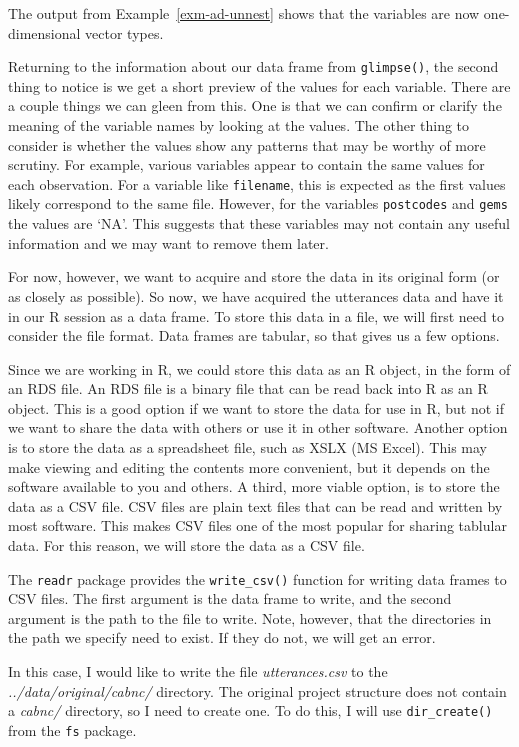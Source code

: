 \documentclass[
  letterpaper,
  DIV=11,
  numbers=noendperiod]{scrreprt}
\theoremstyle{definition}
\theoremstyle{remark}
\begin{document}
The output from Example~\ref{exm-ad-unnest} shows that the variables are
now one-dimensional vector types.

Returning to the information about our data frame from
\texttt{glimpse()}, the second thing to notice is we get a short preview
of the values for each variable. There are a couple things we can gleen
from this. One is that we can confirm or clarify the meaning of the
variable names by looking at the values. The other thing to consider is
whether the values show any patterns that may be worthy of more
scrutiny. For example, various variables appear to contain the same
values for each observation. For a variable like \texttt{filename}, this
is expected as the first values likely correspond to the same file.
However, for the variables \texttt{postcodes} and \texttt{gems} the
values are `NA'. This suggests that these variables may not contain any
useful information and we may want to remove them later.

For now, however, we want to acquire and store the data in its original
form (or as closely as possible). So now, we have acquired the
utterances data and have it in our R session as a data frame. To store
this data in a file, we will first need to consider the file format.
Data frames are tabular, so that gives us a few options.

Since we are working in R, we could store this data as an R object, in
the form of an RDS file. An RDS file is a binary file that can be read
back into R as an R object. This is a good option if we want to store
the data for use in R, but not if we want to share the data with others
or use it in other software. Another option is to store the data as a
spreadsheet file, such as XSLX (MS Excel). This may make viewing and
editing the contents more convenient, but it depends on the software
available to you and others. A third, more viable option, is to store
the data as a CSV file. CSV files are plain text files that can be read
and written by most software. This makes CSV files one of the most
popular for sharing tablular data. For this reason, we will store the
data as a CSV file.

The \texttt{readr} package provides the \texttt{write\_csv()} function
for writing data frames to CSV files. The first argument is the data
frame to write, and the second argument is the path to the file to
write. Note, however, that the directories in the path we specify need
to exist. If they do not, we will get an error.

In this case, I would like to write the file \emph{utterances.csv} to
the \emph{../data/original/cabnc/} directory. The original project
structure does not contain a \emph{cabnc/} directory, so I need to
create one. To do this, I will use \texttt{dir\_create()} from the
\texttt{fs} package.
\end{document}
